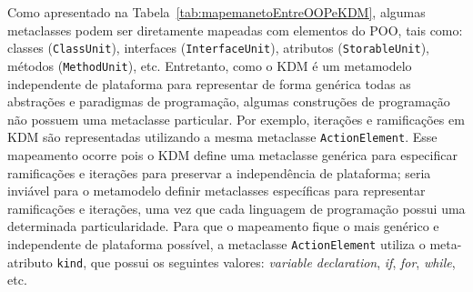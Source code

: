

Como apresentado na Tabela~\ref{tab:mapemanetoEntreOOPeKDM}, algumas metaclasses podem ser diretamente mapeadas com elementos do POO, tais como: classes (\texttt{ClassUnit}), interfaces (\texttt{InterfaceUnit}), atributos (\texttt{StorableUnit}), métodos (\texttt{MethodUnit}), etc. Entretanto, como o KDM é um metamodelo independente de plataforma para representar de forma genérica todas as abstrações e paradigmas de programação, algumas construções de programação não possuem uma metaclasse particular. Por exemplo, iterações e ramificações em KDM são representadas utilizando a mesma metaclasse \texttt{ActionElement}. Esse mapeamento ocorre pois o KDM define uma metaclasse genérica para especificar ramificações e iterações para preservar a independência de plataforma; seria inviável para o metamodelo definir metaclasses específicas para representar ramificações e iterações, uma vez que cada linguagem de programação possui uma determinada particularidade. Para que o mapeamento fique o mais genérico e independente de plataforma possível, a metaclasse \texttt{ActionElement} utiliza o meta-atributo \texttt{kind}, que possui os seguintes valores: \textit{variable declaration}, \textit{if}, \textit{for}, \textit{while}, etc.

